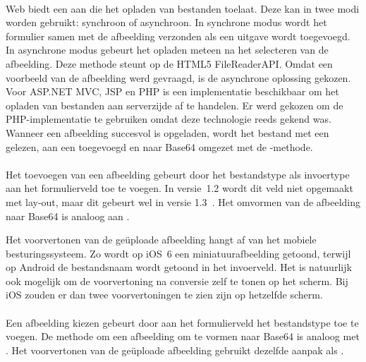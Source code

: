 \paragraph{\kendo}
\kendo{} Web biedt een  aan die het opladen van bestanden toelaat.
Deze  kan in twee modi worden gebruikt: synchroon of asynchroon.
In synchrone modus wordt het formulier samen met de afbeelding verzonden als een uitgave wordt toegevoegd.
In asynchrone modus gebeurt het opladen meteen na het selecteren van de afbeelding.
Deze methode steunt op de HTML5 FileReaderAPI.
Omdat een voorbeeld van de afbeelding werd gevraagd, is de asynchrone oplossing gekozen.	
Voor ASP.NET MVC,  JSP en PHP is een implementatie beschikbaar om het opladen van bestanden aan serverzijde af te handelen.
Er werd gekozen om de PHP-implementatie te gebruiken omdat deze technologie reeds gekend was.
Wanneer een afbeelding succesvol is opgeladen, wordt het bestand met een  gelezen,  aan een  toegevoegd en naar Base64 omgezet met de -methode.

\paragraph{\jqm}
Het toevoegen van een afbeelding gebeurt door het bestandstype als invoertype aan het formulierveld toe te voegen. 
In versie~1.2 wordt dit veld niet opgemaakt met lay-out, maar dit gebeurt wel in versie 1.3~\cite{JQuery2013d}. 
Het omvormen van de afbeelding naar Base64 is analoog aan \kendo{}.

Het voorvertonen van de geüploade afbeelding hangt af van het mobiele besturingssysteem.
Zo wordt op iOS~6 een miniatuurafbeelding getoond, terwijl op Android de bestandsnaam wordt getoond in het invoerveld.
Het is natuurlijk ook mogelijk om de voorvertoning na conversie zelf te tonen op het scherm.
Bij iOS zouden er dan twee voorvertoningen te zien zijn op hetzelfde scherm.

\paragraph{\lungo}
Een afbeelding kiezen gebeurt door aan het formulierveld het bestandstype toe te voegen.
De methode om een afbeelding om te vormen naar Base64 is analoog met \kendo{}.
Het voorvertonen van de geüploade afbeelding gebruikt dezelfde aanpak als \jqm{}.


\subsection{}
\label{sec:evaluatie-gebruik-validatie}

